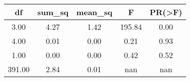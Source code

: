 \begin{tabular}{|c|c|c|c|c|}
\toprule
    df &  sum\_sq &  mean\_sq &      F &  PR(>F) \\
\midrule
  3.00 &    4.27 &     1.42 & 195.84 &    0.00 \\
  4.00 &    0.01 &     0.00 &   0.21 &    0.93 \\
  1.00 &    0.00 &     0.00 &   0.42 &    0.52 \\
391.00 &    2.84 &     0.01 &    nan &     nan \\
\bottomrule
\end{tabular}
